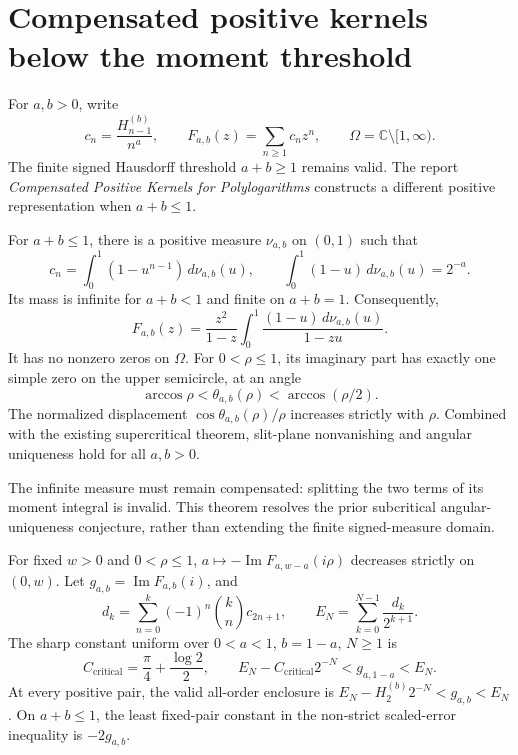 \section{Compensated positive kernels below the moment threshold}
\label{compensated:sec:continuation}
For $a,b>0$, write
\[
 c_n=\frac{H_{n-1}^{(b)}}{n^a},\qquad
 F_{a,b}(z)=\sum_{n\ge1}c_nz^n,\qquad
 \Omega=\mathbb C\setminus[1,\infty).
\]
The finite signed Hausdorff threshold $a+b\ge1$ remains valid.
The report \emph{Compensated Positive Kernels for Polylogarithms}
constructs a different positive representation when $a+b\le1$.

\begin{theorem}
\label{compensated:thm:geometry}
For $a+b\le1$, there is a positive measure $\nu_{a,b}$ on $(0,1)$ such that
\[
 c_n=\int_0^1(1-u^{n-1})\,d\nu_{a,b}(u),\qquad
 \int_0^1(1-u)\,d\nu_{a,b}(u)=2^{-a}.
\]
Its mass is infinite for $a+b<1$ and finite on $a+b=1$.
Consequently,
\[
 F_{a,b}(z)=\frac{z^2}{1-z}
      \int_0^1\frac{(1-u)\,d\nu_{a,b}(u)}{1-zu}.
\]
It has no nonzero zeros on $\Omega$. For $0<\rho\le1$, its imaginary
part has exactly one simple zero on the upper semicircle, at an angle
\[
 \arccos\rho<\theta_{a,b}(\rho)<\arccos(\rho/2).
\]
The normalized displacement $\cos\theta_{a,b}(\rho)/\rho$ increases
strictly with $\rho$. Combined with the existing supercritical theorem,
slit-plane nonvanishing and angular uniqueness hold for all $a,b>0$.
\end{theorem}

The infinite measure must remain compensated: splitting the two terms
of its moment integral is invalid. This theorem resolves the prior
subcritical angular-uniqueness conjecture, rather than extending the
finite signed-measure domain.

\begin{theorem}
\label{compensated:thm:critical}
For fixed $w>0$ and $0<\rho\le1$,
$a\mapsto-\operatorname{Im}F_{a,w-a}(i\rho)$ decreases strictly on $(0,w)$.
Let $g_{a,b}=\operatorname{Im}F_{a,b}(i)$, and
\[
 d_k=\sum_{n=0}^k(-1)^n\binom kn c_{2n+1},\qquad
 E_N=\sum_{k=0}^{N-1}\frac{d_k}{2^{k+1}}.
\]
The sharp constant uniform over $0<a<1$, $b=1-a$, $N\ge1$ is
\[
 C_{\mathrm{critical}}=\frac\pi4+\frac{\log2}{2},\qquad
 E_N-C_{\mathrm{critical}}2^{-N}<g_{a,1-a}<E_N.
\]
At every positive pair, the valid all-order enclosure is
$E_N-H_2^{(b)}2^{-N}<g_{a,b}<E_N$.
On $a+b\le1$, the least fixed-pair constant in the non-strict
scaled-error inequality is $-2g_{a,b}$.
\end{theorem}


